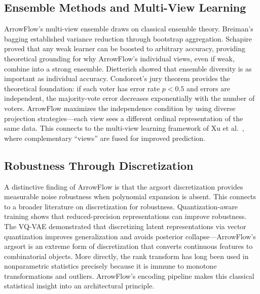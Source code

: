 \documentclass[12pt]{article}
\begin{document}
\subsection{Ensemble Methods and Multi-View Learning}
ArrowFlow's multi-view ensemble draws on classical ensemble theory. Breiman's bagging \citep{breiman1996bagging} established variance reduction through bootstrap aggregation. Schapire \citep{schapire1990strength} proved that any weak learner can be boosted to arbitrary accuracy, providing theoretical grounding for why ArrowFlow's individual views, even if weak, combine into a strong ensemble. Dietterich \citep{dietterich2000ensemble} showed that ensemble diversity is as important as individual accuracy. Condorcet's jury theorem provides the theoretical foundation: if each voter has error rate $p < 0.5$ and errors are independent, the majority-vote error decreases exponentially with the number of voters. ArrowFlow maximizes the independence condition by using diverse projection strategies---each view sees a different ordinal representation of the same data. This connects to the multi-view learning framework of Xu et al.\ \citep{xu2013survey}, where complementary ``views'' are fused for improved prediction.

\subsection{Robustness Through Discretization}
A distinctive finding of ArrowFlow is that the argsort discretization provides measurable noise robustness when polynomial expansion is absent. This connects to a broader literature on discretization for robustness. Quantization-aware training \citep{jacob2018quantization} shows that reduced-precision representations can improve robustness. The VQ-VAE \citep{oord2017neural} demonstrated that discretizing latent representations via vector quantization improves generalization and avoids posterior collapse---ArrowFlow's argsort is an extreme form of discretization that converts continuous features to combinatorial objects. More directly, the rank transform \citep{conover1981rank} has long been used in nonparametric statistics precisely because it is immune to monotone transformations and outliers. ArrowFlow's encoding pipeline makes this classical statistical insight into an architectural principle.
\end{document}

